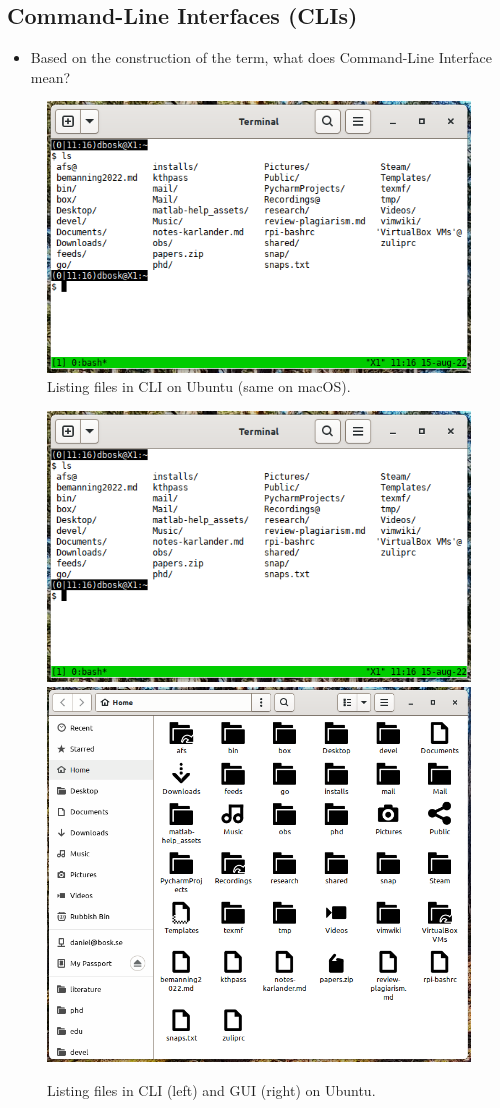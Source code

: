 \subsection{Command-Line Interfaces (CLIs)}

\begin{frame}
  \begin{exercise}
    \begin{itemize}
      \item Based on the construction of the term, what does Command-Line 
        Interface mean?
    \end{itemize}
  \end{exercise}
\end{frame}

\begin{frame}
  \begin{figure}
    \includegraphics[height=0.8\textheight]{fig/files-ls.png}
    \caption{Listing files in CLI on Ubuntu (same on macOS).}
  \end{figure}
\end{frame}

\begin{frame}
  \begin{figure}
    \includegraphics[width=0.4\columnwidth]{fig/files-ls.png}
    \hfill
    \includegraphics[width=0.5\columnwidth]{fig/files.png}
    \caption{Listing files in CLI (left) and GUI (right) on Ubuntu.}
  \end{figure}
\end{frame}

